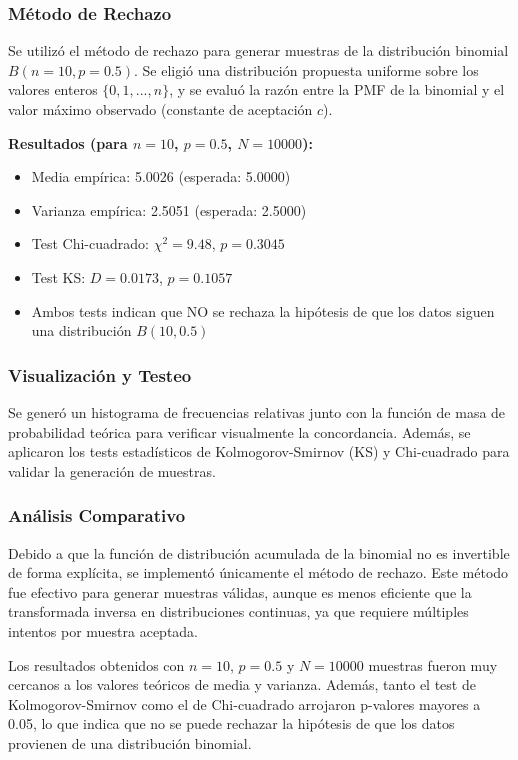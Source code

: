 \documentclass{article}
\begin{document}
\subsubsection{Método de Rechazo}
Se utilizó el método de rechazo para generar muestras de la distribución binomial $B(n=10, p=0.5)$. Se eligió una distribución propuesta uniforme sobre los valores enteros $\{0, 1, ..., n\}$, y se evaluó la razón entre la PMF de la binomial y el valor máximo observado (constante de aceptación $c$).

\textbf{Resultados (para $n=10$, $p=0.5$, $N=10000$):}
\begin{itemize}
    \item Media empírica: 5.0026 \hfill (esperada: 5.0000)
    \item Varianza empírica: 2.5051 \hfill (esperada: 2.5000)
    \item Test Chi-cuadrado: $\chi^2 = 9.48$, $p = 0.3045$
    \item Test KS: $D = 0.0173$, $p = 0.1057$
    \item Ambos tests indican que NO se rechaza la hipótesis de que los datos siguen una distribución $B(10, 0.5)$
\end{itemize}

\vspace{0.5em}
\subsubsection{Visualización y Testeo}
Se generó un histograma de frecuencias relativas junto con la función de masa de probabilidad teórica para verificar visualmente la concordancia. Además, se aplicaron los tests estadísticos de Kolmogorov-Smirnov (KS) y Chi-cuadrado para validar la generación de muestras.

\vspace{0.5em}
\subsubsection{Análisis Comparativo}
Debido a que la función de distribución acumulada de la binomial no es invertible de forma explícita, se implementó únicamente el método de rechazo. Este método fue efectivo para generar muestras válidas, aunque es menos eficiente que la transformada inversa en distribuciones continuas, ya que requiere múltiples intentos por muestra aceptada.

Los resultados obtenidos con $n=10$, $p=0.5$ y $N=10000$ muestras fueron muy cercanos a los valores teóricos de media y varianza. Además, tanto el test de Kolmogorov-Smirnov como el de Chi-cuadrado arrojaron p-valores mayores a 0.05, lo que indica que no se puede rechazar la hipótesis de que los datos provienen de una distribución binomial.
\end{document}
